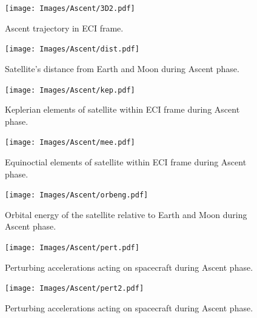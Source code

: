 \begin{figure}
\begin{center}
\texttt{[image: Images/Ascent/3D2.pdf]}
\end{center}
\caption{Ascent trajectory in ECI frame.}
\label{fig:Ascent-3D}
\end{figure}

\begin{figure}
\begin{center}
\texttt{[image: Images/Ascent/dist.pdf]}
\end{center}
\caption{Satellite's distance from Earth and Moon during Ascent phase.}
\label{fig:Ascent-dist}
\end{figure}

\begin{figure}
\begin{center}
\texttt{[image: Images/Ascent/kep.pdf]}
\end{center}
\caption{Keplerian elements of satellite within ECI frame during Ascent phase.}
\label{fig:Ascent-kep}
\end{figure}

\begin{figure}
\begin{center}
\texttt{[image: Images/Ascent/mee.pdf]}
\end{center}
\caption{Equinoctial elements of satellite within ECI frame during Ascent phase.}
\label{fig:Ascent-mee}
\end{figure}

\begin{figure}
\begin{center}
\texttt{[image: Images/Ascent/orbeng.pdf]}
\end{center}
\caption{Orbital energy of the satellite relative to Earth and Moon during Ascent phase.}
\label{fig:Ascent-orbeng}
\end{figure}

\begin{figure}
\begin{center}
\texttt{[image: Images/Ascent/pert.pdf]}
\end{center}
\caption{Perturbing accelerations acting on spacecraft during Ascent phase.}
\label{fig:Ascent-pert}
\end{figure}

\begin{figure}
\begin{center}
\texttt{[image: Images/Ascent/pert2.pdf]}
\end{center}
\caption{Perturbing accelerations acting on spacecraft during Ascent phase.}
\label{fig:Ascent-pert2}
\end{figure}

